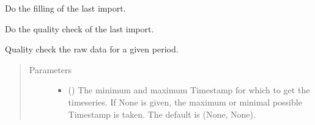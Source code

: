 \documentclass[letterpaper,10pt,english]{sphinxmanual}
\begin{document}
\begin{fulllineitems}

\begin{fulllineitems}
\label{\detokenize{weatherDB:weatherDB.stations.StationsBase.last_imp_fillup}}
\sphinxAtStartPar
Do the filling of the last import.

\end{fulllineitems}


\begin{fulllineitems}
\label{\detokenize{weatherDB:weatherDB.stations.StationsBase.last_imp_quality_check}}
\sphinxAtStartPar
Do the quality check of the last import.

\end{fulllineitems}


\begin{fulllineitems}
\label{\detokenize{weatherDB:weatherDB.stations.StationsBase.quality_check}}
\sphinxAtStartPar
Quality check the raw data for a given period.
\begin{quote}\begin{description}
\item[{Parameters}] \leavevmode\begin{itemize}
\item {} 
\sphinxAtStartPar
{} (\sphinxstyleliteralemphasis{\sphinxupquote{, }}) \textendash{} The minimum and maximum Timestamp for which to get the timeseries.
If None is given, the maximum or minimal possible Timestamp is taken.
The default is (None, None).


\end{itemize}
\end{description}
\end{quote}
\end{fulllineitems}
\end{fulllineitems}
\end{document}
